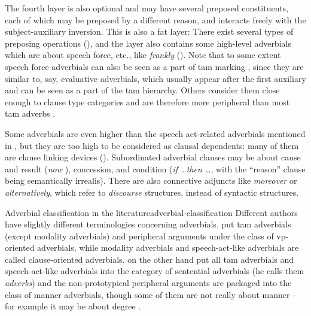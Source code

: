\documentclass[UTF8, a4paper, oneside, scheme=plain, 12pt]{ctexbook}
\newcommand*{\citesec}[1]{\S~{#1}}
\newcommand*{\citepage}[1]{p.~{#1}}
\newcommand*{\citepages}[1]{pp.~{#1}}
\newcommand*{\term}[1]{\emph{#1}}
\newcommand{\form}[1]{\emph{#1}}
\begin{document}
The fourth layer is also optional and may have several preposed constituents,
each of which may be preposed by a different reason,
and interacts freely with the subject-auxiliary inversion.
This is also a fat layer:
There exist several types of preposing operations (),
and the layer also contains some high-level adverbials
which are about speech force, etc., %
like \form{frankly} ().
Note that to some extent speech force adverbials 
can also be seen as a part of \acs{tam} marking
\citep[\citesec{4.4}]{cinque1999adverbs},
since they are similar to, say, evaluative adverbials, 
which usually appear after the first auxiliary 
and can be seen as a part of the \acs{tam} hierarchy.
Others consider them close enough to clause type categories 
and are therefore more peripheral than most \acs{tam} adverbs 
\citep[\citepages{214-216}]{van2013clause}.



Some adverbials are even higher than the speech act-related adverbials 
mentioned in ,
but they are too high to be considered as clausal dependents:
many of them are clause linking devices ().
Subordinated adverbial clauses may be about 
cause and result (\form{now }), 
concession, 
and condition (\form{if \dots then \dots}, with the ``reason'' clause being semantically irrealis).
There are also connective adjuncts like \form{moreover} or \form{alternatively},
which refer to \emph{discourse} structures, instead of syntactic structures.



\begin{infobox}{Adverbial classification in the literature}{adverbial-classification}
    Different authors have slightly different terminologies concerning adverbials.
    \citet[\citepage{576}]{cgel} put \acs{tam} adverbials (except modality adverbials) 
    and peripheral arguments
    under the class of \acs{vp}-oriented adverbials, 
    while modality adverbials and speech-act-like adverbials are called clause-oriented adverbials.
    \citet[\citepage{386}]{dixon2005semantic} on the other hand 
    put all \acs{tam} adverbials and speech-act-like adverbials 
    into the category of sentential adverbials (he calls them \term{adverbs})
    and the non-prototypical peripheral arguments are packaged into the class of manner adverbials,
    though some of them are not really about manner -- 
    for example it may be about degree \citet[\citepage{576}]{cgel}.
\end{infobox}
\end{document}
